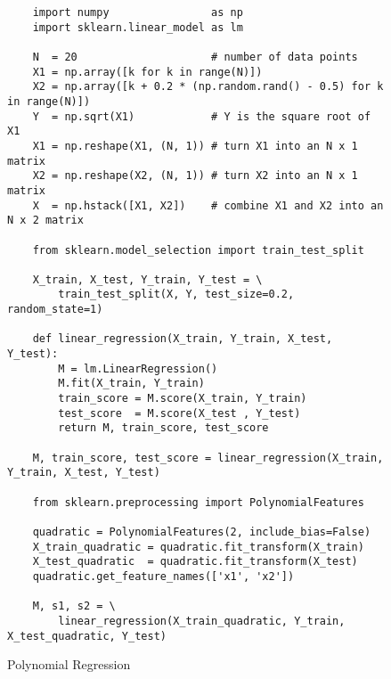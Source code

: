 \begin{figure}[!ht]
\centering
\begin{verbatim}
    import numpy                as np
    import sklearn.linear_model as lm
    
    N  = 20                     # number of data points
    X1 = np.array([k for k in range(N)])
    X2 = np.array([k + 0.2 * (np.random.rand() - 0.5) for k in range(N)])
    Y  = np.sqrt(X1)            # Y is the square root of X1
    X1 = np.reshape(X1, (N, 1)) # turn X1 into an N x 1 matrix
    X2 = np.reshape(X2, (N, 1)) # turn X2 into an N x 1 matrix
    X  = np.hstack([X1, X2])    # combine X1 and X2 into an N x 2 matrix
        
    from sklearn.model_selection import train_test_split
    
    X_train, X_test, Y_train, Y_test = \
        train_test_split(X, Y, test_size=0.2, random_state=1)
    
    def linear_regression(X_train, Y_train, X_test, Y_test):
        M = lm.LinearRegression()
        M.fit(X_train, Y_train)
        train_score = M.score(X_train, Y_train)
        test_score  = M.score(X_test , Y_test)
        return M, train_score, test_score
    
    M, train_score, test_score = linear_regression(X_train, Y_train, X_test, Y_test)
    
    from sklearn.preprocessing import PolynomialFeatures
    
    quadratic = PolynomialFeatures(2, include_bias=False)
    X_train_quadratic = quadratic.fit_transform(X_train)
    X_test_quadratic  = quadratic.fit_transform(X_test)
    quadratic.get_feature_names(['x1', 'x2'])
    
    M, s1, s2 = \
        linear_regression(X_train_quadratic, Y_train, X_test_quadratic, Y_test)
\end{verbatim}
\vspace*{-0.3cm}
\caption{Polynomial Regression}
\label{fig:Polynomial-Regression.ipynb}
\end{figure}

